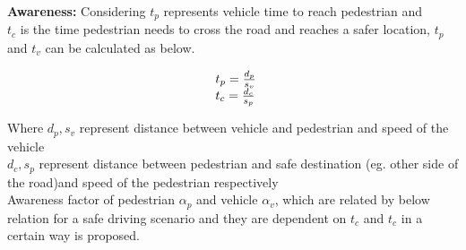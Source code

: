 




\newpara
\textbf{Awareness:}
Considering ${t_p}$ represents vehicle time to reach pedestrian and \\
${t_c}$ is the time pedestrian needs to cross the road and reaches a safer location,
${t_p}$ and ${t_v}$  can be calculated as below.

\begin{equation}
\begin{array}{l@{}}
  t_p = \frac{d_p}{s_v} \\
	t_c = \frac{d_c}{s_p}
\end{array}
\end{equation}

Where ${d_p},{s_v}$ represent distance between vehicle and pedestrian and speed of the vehicle\\
${d_c}, {s_p}$ represent distance between pedestrian and safe destination (eg. other side of the road)and speed of the pedestrian respectively \\
Awareness factor of pedestrian ${\alpha_p}$ and vehicle ${\alpha_v}$, 
which are related by below relation for a safe driving scenario and they are dependent on ${t_c}$ and ${t_c}$ in a certain way is proposed.

